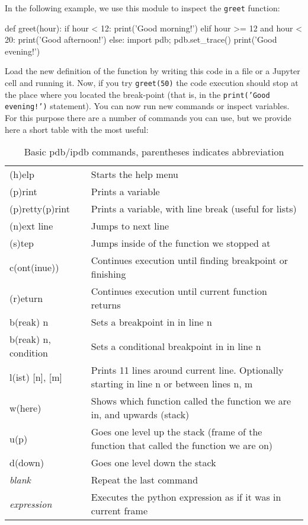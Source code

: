 \noindent In the following example, we use this module to inspect the \texttt{greet} function:

\begin{python}
def greet(hour):
    if hour < 12:
        print('Good morning!')
    elif hour >= 12 and hour < 20:
        print('Good afternoon!')
    else:
        import pdb; pdb.set_trace()
        print('Good evening!')
\end{python}

Load the new definition of the function by writing this code in a file or a Jupyter cell and running it. Now, if you try \texttt{greet(50)} the code execution should stop at the place where you located the break-point (that is, in the \texttt{print('Good evening!')} statement). You can now run new commands or inspect variables. For this purpose there are a number of commands you can use\footnotemark{}, but we provide here a short table with the most useful: 

\begin{table}[!h]
\begin{center}
\begin{tabular}{|l|l|}
\hline
(h)elp           & Starts the help menu\\
(p)rint          & Prints a variable\\
(p)retty(p)rint	 & Prints a variable, with line break (useful for lists)\\
\hline
(n)ext line      & Jumps to next line\\ 
(s)tep           & Jumps inside of the function we stopped at\\
c(ont(inue))     & Continues execution until finding breakpoint or finishing\\
(r)eturn         & Continues execution until current function returns\\
b(reak) n        & Sets a breakpoint in in line n\\
b(reak) n, condition  & Sets a conditional breakpoint in in line n\\
\hline
l(ist) [n], [m]  & Prints 11 lines around current line. Optionally starting in line n or between lines n, m\\
w(here)          & Shows which function called the function we are in, and upwards (stack)\\
u(p)             & Goes one level up the stack (frame of the function that called the function we are on)\\
d(down)          & Goes one level down the stack\\
\hline
\textit{blank}          & Repeat the last command\\ 
\textit{expression}     & Executes the python expression as if it was in current frame\\
\hline
\end{tabular}
\end{center}
\caption{\label{tb::pdbbasiccommands}Basic pdb/ipdb commands, parentheses indicates abbreviation}
\end{table}

